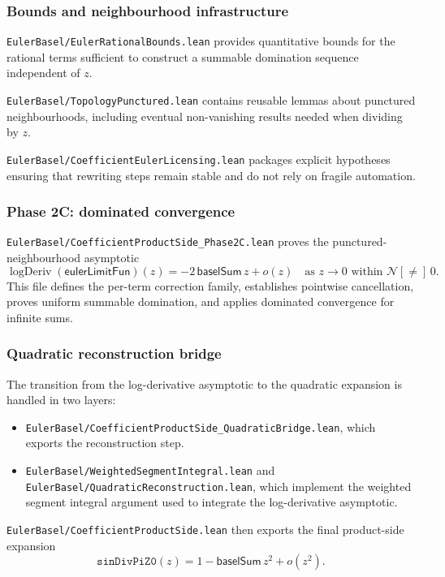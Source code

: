 \documentclass[11pt,a4paper]{article}
\theoremstyle{plain}
\theoremstyle{definition}
\DeclareRobustCommand{\codepath}[1]{\nolinkurl{#1}}
\newcommand{\nhdsPunct}[1]{\ensuremath{\mathcal{N}[{\neq}]\,#1}}
\DeclareRobustCommand{\leanid}[1]{\texttt{#1}}
\DeclareRobustCommand{\codepath}[1]{\nolinkurl{#1}}
\newcommand{\baselSum}{\ensuremath{\mathsf{baselSum}}}
\newcommand{\sinDivPiZZero}{\leanid{sinDivPiZ0}}
\newcommand{\eulerLimitFun}{\ensuremath{\mathsf{eulerLimitFun}}}
\DeclareMathOperator{\logDeriv}{logDeriv}
\begin{document}
\subsubsection{Bounds and neighbourhood infrastructure}

\texttt{EulerBasel/EulerRationalBounds.lean}
provides quantitative bounds for the rational terms sufficient to construct a summable domination sequence independent of \(z\).

\texttt{EulerBasel/TopologyPunctured.lean}
contains reusable lemmas about punctured neighbourhoods, including eventual non-vanishing results needed when dividing by \(z\).

\texttt{EulerBasel/CoefficientEulerLicensing.lean}
packages explicit hypotheses ensuring that rewriting steps remain stable and do not rely on fragile automation.

\subsubsection{Phase 2C: dominated convergence}

\codepath{EulerBasel/CoefficientProductSide_Phase2C.lean}
proves the punctured-neighbourhood asymptotic
\[
\logDeriv(\eulerLimitFun)(z)
=
-2\,\baselSum\, z
+ o(z)
\quad
\text{as } z \to 0 \text{ within } \nhdsPunct{0}.
\]
This file defines the per-term correction family, establishes pointwise cancellation, proves uniform summable domination, and applies dominated convergence for infinite sums.

\subsubsection{Quadratic reconstruction bridge}

The transition from the log-derivative asymptotic to the quadratic expansion is handled in two layers:

\begin{itemize}[leftmargin=2em]
  \item \codepath{EulerBasel/CoefficientProductSide_QuadraticBridge.lean}, which exports the reconstruction step.
  \item \codepath{EulerBasel/WeightedSegmentIntegral.lean} and
        \codepath{EulerBasel/QuadraticReconstruction.lean}, which implement the weighted segment integral argument used to integrate the log-derivative asymptotic.
\end{itemize}

\codepath{EulerBasel/CoefficientProductSide.lean} then exports the final product-side expansion
\[
\sinDivPiZZero(z)
=
1 - \baselSum\, z^{2}
+ o(z^{2}).
\]
\end{document}
